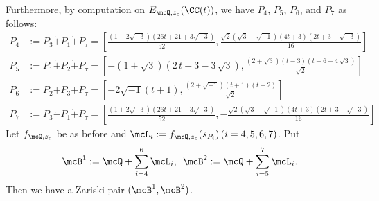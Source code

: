 \begin{exmple}[{\bf Combinatorics 1}]
Furthermore, by computation on $E_{\mcQ, z_{o}}(\CC(t))$, we have $P_{4}$, $P_{5}$, $P_{6}$, and $P_{7}$ as follows:
\begin{align*}
P_4 & := P_3 \dot{+} P_1 \dot{+} P_{\tau} = \left[ {\frac { \left( 1-2 \sqrt {-3} \right)  \left( 26t+
21+3 \sqrt {-3} \right) }{52}}, \frac{\sqrt{2}(\sqrt{3}+\sqrt{-1})(4t+3)(2t+3+\sqrt{-3})}{16} \right] \\
%
P_5 & := P_1 \dot{+} P_2 \dot{+} P_{\tau} = \left[ -(1+\sqrt {3})( 2\,t-3-3\,\sqrt {3}),  \frac{\left( 2+\sqrt {3} \right)  \left( t-3 \right)  \left( t-6-4\,\sqrt {3} \right)
}{\sqrt{2}} \right] \\
%
P_6 & := P_2 \dot{+} P_3 \dot{+} P_{\tau} = \left[ -2 \sqrt{-1}(t+1), \frac{(2+ \sqrt{-1})(t+1)(t+2)}{\sqrt{2}} \right]\\
%
P_7 & := P_3 \dot{-} P_1 \dot{+} P_{\tau} = \left[ {\frac { \left( 1+2 \sqrt {-3} \right)  \left( 26t+
21-3 \sqrt {-3} \right) }{52}}, - \frac{\sqrt{2}(\sqrt{3}-\sqrt{-1})(4t+3)(2t+3-\sqrt{-3})}{16} \right]
\end{align*}
Let $f_{\mcQ, z_o}$ be as before and $\mcL_i := f_{\mcQ , z_{o}}(s_{P_{i}}) \, (i=4, 5, 6, 7)$.
Put
\[
\mcB^1 := \mcQ + \sum_{i=4}^6 \mcL_i,\,\,\, 
\mcB^2 := \mcQ + \sum_{i=5}^7 \mcL_i.
\]
Then we have a Zariski pair $(\mcB^1 , \mcB^2 )$.


\end{exmple}
